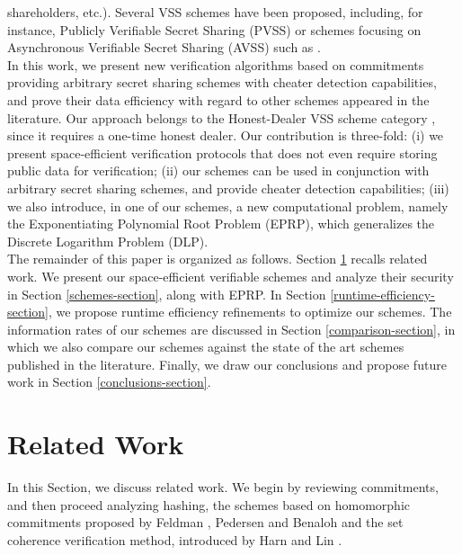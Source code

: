 \documentclass[10pt,journal,cspaper,compsoc]{IEEEtran}
\begin{document}
shareholders, etc.). Several VSS schemes have been proposed, including, for instance, Publicly Verifiable Secret Sharing (PVSS) \cite{Stadler}  \cite{Fujisaki-Okamoto}  \cite{Schoenmakers}  \cite{Boudot} \cite{Peng-Bao}  \cite{Peng} or schemes focusing on Asynchronous Verifiable Secret Sharing (AVSS) such as \cite{Beerliov} \cite{Ben-Or} \cite{Canetti95} \cite{Ben-Or:1994} \cite{Canetti:1993} \cite{Patra} \cite{Patra2015}.\\ In this work, we present new verification algorithms based on commitments providing arbitrary secret sharing schemes with cheater detection capabilities, and prove their data efficiency with regard to other schemes appeared in the literature. Our approach belongs to the Honest-Dealer VSS scheme category \cite{Cramer2001}\cite{Rabin1994}, since it requires a one-time honest dealer. Our contribution is three-fold: (i) we present space-efficient verification protocols that does not even require storing public data for verification; (ii) our schemes can be used in conjunction with arbitrary secret sharing schemes, and provide cheater detection capabilities; (iii) we also introduce, in one of our schemes, a new computational problem, namely the Exponentiating Polynomial Root Problem (EPRP), which generalizes the Discrete Logarithm Problem (DLP).\\ 
The remainder of this paper is organized as follows. Section \ref{related-work-section} recalls related work. We present our space-efficient verifiable schemes and analyze their security in  Section \ref{schemes-section}, along with EPRP. In Section \ref{runtime-efficiency-section}, we propose runtime efficiency refinements to optimize our schemes. The information rates of our schemes are discussed in Section \ref{comparison-section}, in which we also compare our schemes against the state of the art schemes published in the literature. Finally, we draw our conclusions and propose future work in Section \ref{conclusions-section}.





\section{Related Work}
\label{related-work-section}

In this Section, we discuss related work. We begin by reviewing commitments, and then proceed analyzing hashing, the schemes based on homomorphic commitments proposed by Feldman \cite{Feldman}, Pedersen \cite{conf/crypto/Pedersen91} and Benaloh \cite{conf/crypto/Benaloh86a} and the set coherence verification method, introduced by Harn and Lin \cite{journals/dcc/HarnL09}.
\end{document}
